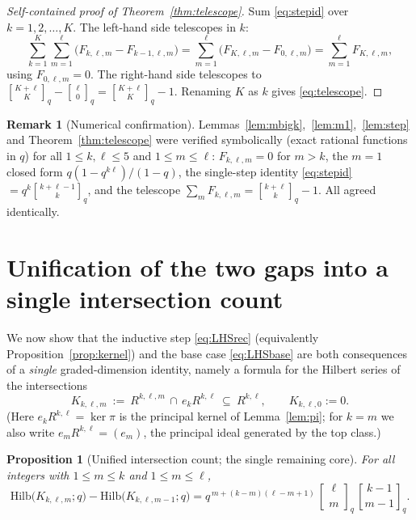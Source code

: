 \documentclass{amsart}
\newtheorem{proposition}{Proposition}
\theoremstyle{definition}
\newtheorem{remark}{Remark}
\newcommand{\Hilb}{\mathrm{Hilb}}
\newcommand{\qbin}[2]{\genfrac{[}{]}{0pt}{}{#1}{#2}_q}
\newcommand{\rkl}{R^{k,\ell}}
\newcommand{\Rklm}{R^{k,\ell,m}}
\begin{document}
\begin{proof}[Self-contained proof of Theorem~\ref{thm:telescope}]
Sum \eqref{eq:stepid} over $k=1,2,\dots,K$. The left-hand side telescopes in $k$:
\[
\sum_{k=1}^{K}\sum_{m=1}^{\ell}\big(F_{k,\ell,m}-F_{k-1,\ell,m}\big)
=\sum_{m=1}^{\ell}\big(F_{K,\ell,m}-F_{0,\ell,m}\big)
=\sum_{m=1}^{\ell}F_{K,\ell,m},
\]
using $F_{0,\ell,m}=0$. The right-hand side telescopes to
$\qbin{K+\ell}{K}-\qbin{\ell}{0}=\qbin{K+\ell}{K}-1$. Renaming $K$ as $k$ gives
\eqref{eq:telescope}.
\end{proof}

\begin{remark}[Numerical confirmation]\label{rem:telnum}
Lemmas~\ref{lem:mbigk},~\ref{lem:m1},~\ref{lem:step} and
Theorem~\ref{thm:telescope} were verified symbolically (exact rational functions in
$q$) for all $1\le k,\ell\le5$ and $1\le m\le\ell$: $F_{k,\ell,m}=0$ for $m>k$, the
$m=1$ closed form $q(1-q^{k\ell})/(1-q)$, the single-step identity \eqref{eq:stepid}
$=q^k\qbin{k+\ell-1}{k}$, and the telescope $\sum_m F_{k,\ell,m}=\qbin{k+\ell}{k}-1$.
All agreed identically.
\end{remark}


\section{Unification of the two gaps into a single intersection count}
\label{sec:unify}

We now show that the inductive step \eqref{eq:LHSrec} (equivalently
Proposition~\ref{prop:kernel}) and the base case \eqref{eq:LHSbase} are both
consequences of a \emph{single} graded-dimension identity, namely a formula for the
Hilbert series of the intersections
\[
K_{k,\ell,m}\ :=\ \Rklm\,\cap\, e_k\rkl\ \subseteq\ \rkl ,\qquad K_{k,\ell,0}:=0 .
\]
(Here $e_k\rkl=\ker\pi$ is the principal kernel of Lemma~\ref{lem:pi}; for $k=m$ we
also write $e_m\rkl=(e_m)$, the principal ideal generated by the top class.)

\begin{proposition}[Unified intersection count; the single remaining core]
\label{prop:unified}
For all integers with $1\le m\le k$ and $1\le m\le\ell$,
\begin{equation}\label{eq:unified}
\Hilb\!\big(K_{k,\ell,m};q\big)-\Hilb\!\big(K_{k,\ell,m-1};q\big)
=q^{\,m+(k-m)(\ell-m+1)}\,\qbin{\ell}{m}\,\qbin{k-1}{m-1}.
\end{equation}
\end{proposition}
\end{document}
